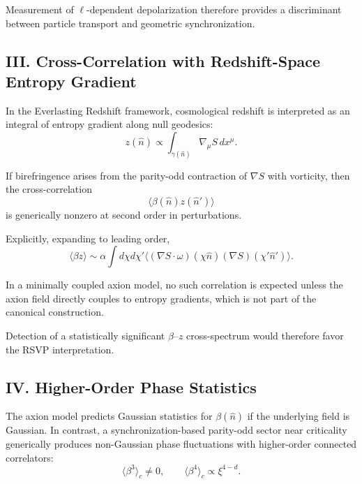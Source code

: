 \documentclass[12pt]{article}
\begin{document}
Measurement of $\ell$-dependent depolarization therefore provides a discriminant between particle transport and geometric synchronization.

\subsection*{III. Cross-Correlation with Redshift-Space Entropy Gradient}

In the Everlasting Redshift framework, cosmological redshift is interpreted as an integral of entropy gradient along null geodesics:
\begin{equation}
z(\hat n)
\propto
\int_{\gamma(\hat n)}
\nabla_\mu S \, dx^\mu.
\end{equation}

If birefringence arises from the parity-odd contraction of $\nabla S$ with vorticity, then the cross-correlation
\begin{equation}
\langle \beta(\hat n) z(\hat n') \rangle
\end{equation}
is generically nonzero at second order in perturbations.

Explicitly, expanding to leading order,
\begin{equation}
\langle \beta z \rangle
\sim
\alpha
\int d\chi d\chi'
\langle
(\nabla S \cdot \omega)(\chi\hat n)
(\nabla S)(\chi'\hat n')
\rangle.
\end{equation}

In a minimally coupled axion model, no such correlation is expected unless the axion field directly couples to entropy gradients, which is not part of the canonical construction.

Detection of a statistically significant $\beta$–$z$ cross-spectrum would therefore favor the RSVP interpretation.

\subsection*{IV. Higher-Order Phase Statistics}

The axion model predicts Gaussian statistics for $\beta(\hat n)$ if the underlying field is Gaussian. In contrast, a synchronization-based parity-odd sector near criticality generically produces non-Gaussian phase fluctuations with higher-order connected correlators:
\begin{equation}
\langle \beta^3 \rangle_c \neq 0,
\qquad
\langle \beta^4 \rangle_c \propto \xi^{4-d}.
\end{equation}
\end{document}

